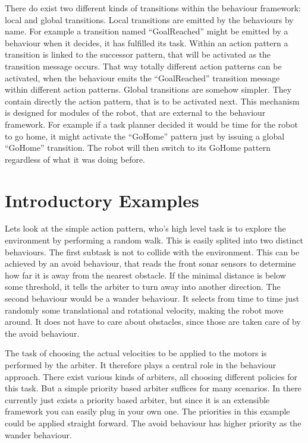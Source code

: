 There do exist two different kinds of transitions within the behaviour
framework: local and global transitions. Local transitions are emitted
by the behaviours by name. For example a transition named
``GoalReached'' might be emitted by a behaviour when it decides, it
has fulfilled its task. Within an action pattern a transition is
linked to the successor pattern, that will be activated as the
transition message occurs. That way totally different action patterns
can be activated, when the behaviour emits the ``GoalReached''
transition message within different action patterns. Global
transitions are somehow simpler. They contain directly the action
pattern, that is to be activated next. This mechanism is designed for
modules of the robot, that are external to the behaviour framework.
For example if a task planner decided it would be time for the robot
to go home, it might activate the ``GoHome'' pattern just by issuing a
global ``GoHome'' transition. The robot will then switch to its GoHome
pattern regardless of what it was doing before.

\section{Introductory Examples}

Lets look at the simple action pattern, who's high level task is to
explore the environment by performing a random walk. This is easily
splited into two distinct behaviours. The first subtask is not to
collide with the environment. This can be achieved by an avoid
behaviour, that reads the front sonar sensors to determine how far it
is away from the nearest obstacle. If the minimal distance is below
some threshold, it tells the arbiter to turn away into another
direction. The second behaviour would be a wander behaviour. It selects
from time to time just randomly some translational and rotational
velocity, making the robot move around. It does not have to care about
obstacles, since those are taken care of by the avoid behaviour.

The task of choosing the actual velocities to be applied to the motors
is performed by the arbiter. It therefore plays a central role in the
behaviour approach. There exist various kinds of arbiters, all
choosing different policies for this task. But a simple priority based
arbiter suffices for many scenarios. In \miro there currently just
exists a priority based arbiter, but since it is an extensible
framework you can easily plug in your own one. The priorities in this
example could be applied straight forward. The avoid behaviour has
higher priority as the wander behaviour.

